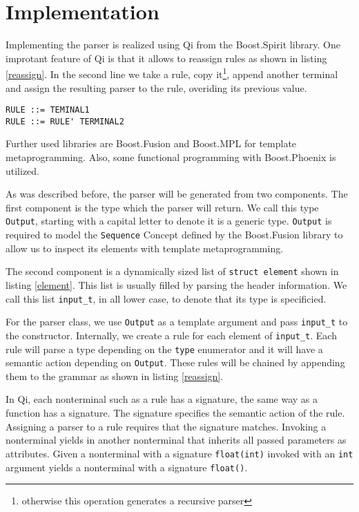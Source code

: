 \section{Implementation}

Implementing the parser is realized using Qi from the Boost.Spirit library. One
improtant feature of Qi is that it allows to reassign rules as shown in listing
\ref{reassign}. In the second line we take a rule, copy it\footnote{otherwise
this operation generates a recursive parser}, append another terminal and assign
the resulting parser to the rule, overiding its previous value. 

\begin{lstlisting}[frame=tb,label=reassign,caption=reassigning rules]
RULE ::= TEMINAL1
RULE ::= RULE' TERMINAL2
\end{lstlisting}

Further used libraries are Boost.Fusion and Boost.MPL for template
metaprogramming. Also, some functional programming with Boost.Phoenix is
utilized.

As was described before, the parser will be generated from two components. The
first component is the type which the parser will return. We call this type
\texttt{Output}, starting with a capital letter to denote it is a generic type.
\texttt{Output} is required to model the \texttt{Sequence} Concept defined by
the Boost.Fusion library to allow us to inspect its elements with template
metaprogramming.

The second component is a dynamically sized list of \texttt{struct element}
shown in listing \ref{element}. This list is usually filled by parsing the
header information. We call this list \texttt{input\_t}, in all lower case, to
denote that its type is specificied.

For the parser class, we use \texttt{Output} as a template argument and pass
\texttt{input\_t} to the constructor. Internally, we create a rule for each
element of \texttt{input\_t}. Each rule will parse a type depending on the
\texttt{type} enumerator and it will have a semantic action depending on
\texttt{Output}. These rules will be chained by appending them to the grammar
as shown in listing \ref{reassign}.

In Qi, each nonterminal such as a rule has a signature, the same way as a
function has a signature. The signature specifies the semantic action of the
rule. Assigning a parser to a rule requires that the signature matches. 
Invoking a nonterminal yields in another nonterminal that inherits all passed
parameters as attributes. Given a nonterminal with a signature
\texttt{float(int)} invoked with an \texttt{int} argument yields a nonterminal
with a signature \texttt{float()}.

